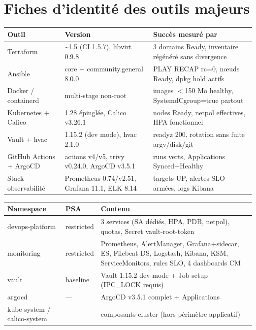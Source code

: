 \documentclass[12pt,a4paper,oneside]{report}
\begin{document}
\section{Fiches d'identité des outils majeurs}

\begin{center}\label{tab:ch-fiches-d-identite-synthese}\end{center}
\begin{longtable}{@{}p{2.6cm}p{3.6cm}p{7.4cm}@{}}
\toprule
\textbf{Outil} & \textbf{Version} & \textbf{Succès mesuré par} \\
\midrule
\endhead
Terraform & \textasciitilde 1.5 (CI 1.5.7), libvirt 0.9.8 & 3 domains Ready, inventaire régénéré sans divergence \\
Ansible & core + community.general 8.0.0 & PLAY RECAP rc=0, nœuds Ready, dpkg hold actifs \\
Docker / containerd & multi-stage non-root & images $<$150 Mo healthy, SystemdCgroup=true partout \\
Kubernetes + Calico & 1.28 épinglée, Calico v3.26.1 & nodes Ready, netpol effectives, HPA fonctionnel \\
Vault + hvac & 1.15.2 (dev mode), hvac 2.1.0 & readyz 200, rotation sans fuite argv/disk/git \\
GitHub Actions + ArgoCD & actions v4/v5, trivy v0.24.0, ArgoCD v3.5.1 & runs verts, Applications Synced+Healthy \\
Stack observabilité & Prometheus 0.74/v2.51, Grafana 11.1, ELK 8.14 & targets UP, alertes SLO armées, logs Kibana \\
\bottomrule
\end{longtable}

\begin{center}\label{tab:ch-fiches-d-identite-des-outils-majeurs-inventaire-}\end{center}
\begin{longtable}{@{}p{3.4cm}p{2.6cm}p{8.0cm}@{}}
\toprule
\textbf{Namespace} & \textbf{PSA} & \textbf{Contenu} \\
\midrule
\endhead
devops-platform & restricted & 3 services (SA dédiés, HPA, PDB, netpol), quotas, Secret vault-root-token \\
monitoring & restricted & Prometheus, AlertManager, Grafana+sidecar, ES, Filebeat DS, Logstash, Kibana, KSM, ServiceMonitors, rules SLO, 4 dashboards CM \\
vault & baseline & Vault 1.15.2 dev-mode + Job setup (IPC\_LOCK requis) \\
argocd & --- & ArgoCD v3.5.1 complet + Applications \\
kube-system / calico-system & --- & composants cluster (hors périmètre applicatif) \\
\bottomrule
\end{longtable}
\end{document}

